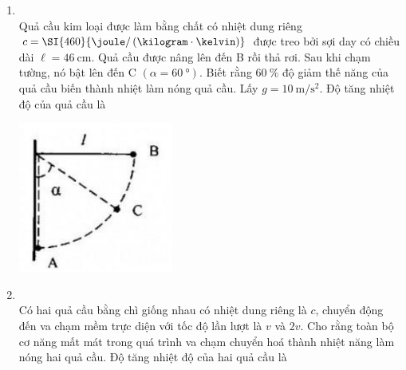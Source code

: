 \begin{enumerate}[label=\bfseries Câu \arabic*:, leftmargin=1.7cm]
\item {}\\
Quả cầu kim loại được làm bằng chất có nhiệt dung riêng $c=\SI{460}{\joule/\left(\kilogram\cdot\kelvin\right)}$ được treo bởi sợi day có chiều dài $\ell=\SI{46}{\centi\meter}$. Quả cầu được nâng lên đến B rồi thả rơi. Sau khi chạm tường, nó bật lên đến C $\left(\alpha=\SI{60}{\degree}\right)$. Biết rằng $\SI{60}{\percent}$ độ giảm thế năng của quả cầu biến thành nhiệt làm nóng quả cầu. Lấy $g=\SI{10}{\meter/\second^2}$. Độ tăng nhiệt độ của quả cầu là
\begin{center}
	\includegraphics[width=0.3\linewidth]{../figs/VN12-Y24-PH-SYL-004P-2}
\end{center}

\item {}\\
Có hai quả cầu bằng chì giống nhau có nhiệt dung riêng là $c$, chuyển động đến va chạm mềm trực diện với tốc độ lần lượt là $v$ và $2v$. Cho rằng toàn bộ cơ năng mất mát trong quá trình va chạm chuyển hoá thành nhiệt năng làm nóng hai quả cầu. Độ tăng nhiệt độ của hai quả cầu là


\end{enumerate}
